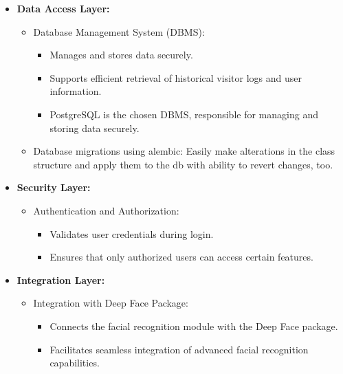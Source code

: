 \documentclass[a4 paper, 12pt]{article}
\begin{document}
\begin{enumerate}
\begin{itemize}
            \item \textbf{Data Access Layer:}
                \begin{itemize}
                    \item Database Management System (DBMS):
                        \begin{itemize}
                            \item Manages and stores data securely.
                            \item Supports efficient retrieval of historical visitor logs and user information. \item PostgreSQL is the chosen DBMS, responsible for managing and storing data securely.
                        \end{itemize}

                    \item Database migrations using alembic: Easily make alterations in the class structure and apply them to the db with ability to revert changes, too.
                \end{itemize}
            
            \item \textbf{Security Layer:}
                \begin{itemize}
                    \item Authentication and Authorization:
                        \begin{itemize}
                            \item Validates user credentials during login.
                            \item Ensures that only authorized users can access certain features.
                        \end{itemize}
                \end{itemize}
            
            \item \textbf{Integration Layer:}
                \begin{itemize}
                    \item Integration with Deep Face Package:
                        \begin{itemize}
                            \item Connects the facial recognition module with the Deep Face package.
                            \item Facilitates seamless integration of advanced facial recognition capabilities.
                        \end{itemize}
                \end{itemize}
            

\end{itemize}
\end{enumerate}
\end{document}
